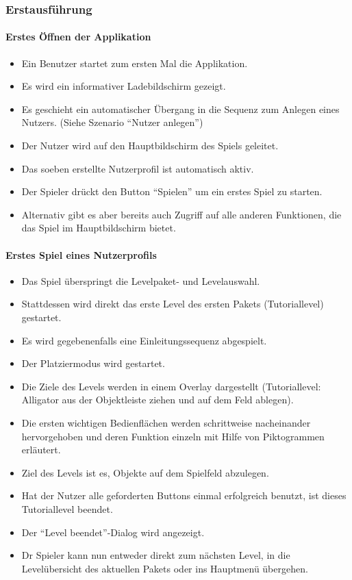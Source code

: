 \subsubsection{Erstausführung}
\paragraph{Erstes Öffnen der Applikation}
\begin{itemize}
\item Ein Benutzer startet zum ersten Mal die Applikation. 
\item Es wird ein informativer Ladebildschirm gezeigt.
\item Es geschieht ein automatischer Übergang in die Sequenz zum
Anlegen eines Nutzers. \newline (Siehe Szenario "`Nutzer anlegen"')
\item Der Nutzer wird auf den Hauptbildschirm des Spiels geleitet. 
\item Das soeben erstellte Nutzerprofil ist automatisch aktiv.
\item Der Spieler drückt den Button "`Spielen"' um ein erstes Spiel zu starten.
\item Alternativ gibt es aber bereits auch Zugriff auf alle anderen Funktionen,
die das Spiel im Hauptbildschirm bietet.
\end{itemize}

\paragraph{Erstes Spiel eines Nutzerprofils}
\begin{itemize}
\item Das Spiel überspringt die Levelpaket- und Levelauswahl.
\item Stattdessen wird direkt das erste Level des ersten Pakets (Tutoriallevel) gestartet.
\item Es wird gegebenenfalls eine Einleitungssequenz abgespielt.
\item Der Platziermodus wird gestartet.
\item Die Ziele des Levels werden in einem Overlay dargestellt (Tutoriallevel: Alligator aus der Objektleiste ziehen und auf dem Feld ablegen).
\item Die ersten wichtigen Bedienflächen werden schrittweise nacheinander hervorgehoben und deren Funktion
einzeln mit Hilfe von Piktogrammen erläutert.
\item Ziel des Levels ist es, Objekte auf dem Spielfeld abzulegen.
\item Hat der Nutzer alle geforderten Buttons einmal erfolgreich benutzt, ist dieses Tutoriallevel beendet.
\item Der "`Level beendet"'-Dialog wird angezeigt. 
\item Dr Spieler kann nun entweder direkt zum nächsten Level, in die Levelübersicht des aktuellen Pakets oder
ins Hauptmenü übergehen.
\end{itemize}
